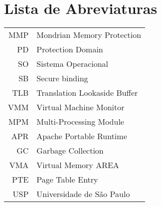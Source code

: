 \chapter*{Lista de Abreviaturas}
\begin{tabular}{rl}
  MMP      & Mondrian Memory Protection\\
  PD       & Protection Domain\\
  SO       & Sistema Operacional\\
  SB       & Secure binding \\
  TLB      & Translation Lookaside Buffer \\
  VMM      & Virtual Machine Monitor \\
  MPM      & Multi-Processing Module \\
  APR      & Apache Portable Runtime \\
  GC       & Garbage Collection \\
  VMA      & Virtual Memory AREA\\
  PTE      & Page Table Entry\\
  USP      & Universidade de São Paulo
\end{tabular}



{\let\cleardoublepage\relax {} \listoffigures }

